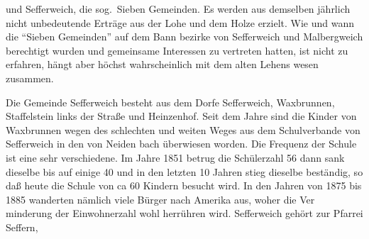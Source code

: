 

und Sefferweich, die sog.\ Sieben Gemeinden. Es\ob
werden aus demselben jährlich nicht unbedeutende\ob
Erträge aus der Lohe und dem Holze erzielt. Wie und\ob
wann die \enquote{Sieben Gemeinden} auf dem Bann\ohb
bezirke von Sefferweich und Malbergweich\ob
berechtigt wurden und gemeinsame Interessen\ob
zu vertreten hatten, ist nicht zu erfahren, hängt\ob
aber höchst wahrscheinlich mit dem alten Lehens\ohb
wesen zusammen.

%
Die Gemeinde Sefferweich besteht aus dem Dorfe\ob
Sefferweich, Waxbrunnen, Staffelstein links\ob
der Straße und Heinzenhof. Seit dem Jahre sind die Kinder von Waxbrunnen\ob
{}%
wegen des schlechten und weiten Weges aus dem\ob
Schulverbande von Sefferweich in den von Neiden\ohb
bach überwiesen worden. Die Frequenz der\ob
Schule ist eine sehr verschiedene. Im Jahre 1851\ob
betrug die Schülerzahl 56 dann sank dieselbe\ob
bis auf einige 40 und in den letzten 10 Jahren\ob
stieg dieselbe beständig, so daß heute die Schule\ob
von ca 60 Kindern besucht wird. In den Jahren\ob
von 1875 bis 1885 wanderten nämlich viele\ob
{}%
Bürger nach Amerika aus, woher die Ver\ohb
minderung der Einwohnerzahl wohl herrühren\ob
wird. Sefferweich gehört zur Pfarrei Seffern,
\pend
